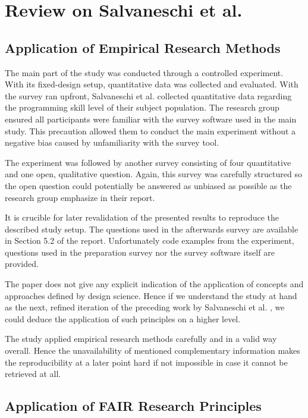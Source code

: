\documentclass[12pt,a4paper]{article}
\begin{document}
\section{Review on Salvaneschi et al.}
\label{sec:review}

\subsection{Application of Empirical Research Methods}

The main part of the study was conducted through a controlled experiment. With its fixed-design setup, quantitative data was collected and evaluated. With the survey ran upfront, Salvaneschi et al. collected quantitative data regarding the programming skill level of their subject population. The research group ensured all participants were familiar with the survey software used in the main study. This precaution allowed them to conduct the main experiment without a negative bias caused by unfamiliarity with the survey tool.

The experiment was followed by another survey consisting of four quantitative and one open, qualitative question. Again, this survey was carefully structured so the open question could potentially be answered as unbiased as possible as the research group emphasize in their report.

It is crucible for later revalidation of the presented results to reproduce the described study setup. The questions used in the afterwards survey are available in Section 5.2 of the report. Unfortunately code examples from the experiment, questions used in the preparation survey nor the survey software itself are provided.

The paper does not give any explicit indication of the application of concepts and approaches defined by design science. Hence if we understand the  study at hand as the next, refined iteration of the preceding work by Salvaneschi et al. \cite{Salvaneschi:2014:ESP:2635868.2635895}, we could deduce the application of such principles on a higher level.

The study applied empirical research methods carefully and in a valid way overall. Hence the unavailability of mentioned complementary information makes the reproducibility at a later point hard if not impossible in case it cannot be retrieved at all.

\subsection{Application of FAIR Research Principles}
\end{document}
